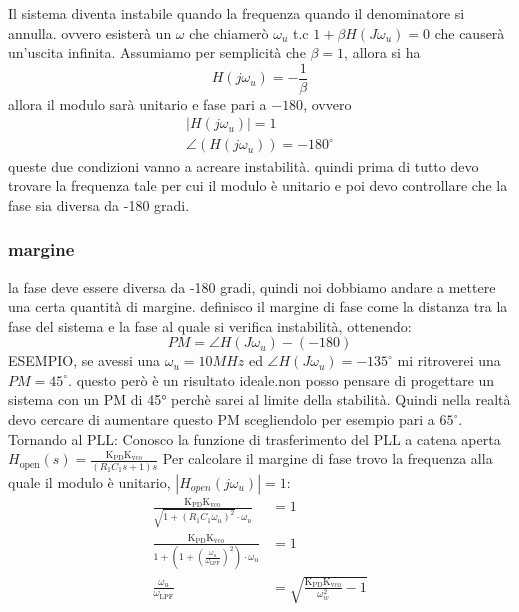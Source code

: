 Il sistema diventa instabile quando la frequenza quando il denominatore si annulla.
ovvero esisterà un $\omega$ che chiamerò $\omega_u$ t.c $1+\beta H(J \omega_u)=0$ che causerà un'uscita infinita.
Assumiamo per semplicità che $\beta=1$, allora si ha
\begin{equation}
    H(j\omega_u)=-\frac{1}{\beta}
\end{equation}
allora il modulo sarà unitario e fase pari a $-180$, ovvero
\begin{align}
    |H(j\omega_u)|=1 \\
    \angle(H(j\omega_u))=-180^\circ
\end{align}
queste due condizioni vanno a acreare instabilità.
quindi prima di tutto devo trovare la frequenza tale per cui il modulo è unitario e poi devo controllare che la fase sia diversa da -180 gradi. 

\subsubsection{margine}
la fase deve essere diversa da -180 gradi, quindi noi dobbiamo andare a mettere una certa quantità di margine.
definisco il margine di fase come la distanza tra la fase del sistema e la fase al quale si verifica instabilità, ottenendo:
\begin{equation}
    PM=\angle H(J\omega_u) -(-180)
\end{equation}
ESEMPIO, se avessi una $\omega_u=10MHz$ ed $\angle H(J\omega_u)=-135 ^\circ$ mi ritroverei una $PM=45 ^\circ$.
questo però è un risultato ideale.non posso pensare di progettare un sistema con un PM di 45° perchè sarei al limite della stabilità.
Quindi nella realtà devo cercare di aumentare questo PM scegliendolo per esempio pari a $65^\circ$.
%
Tornando al PLL:%
Conosco la funzione di trasferimento del PLL a catena aperta $ H_{\text{open}}(s) = \frac{\text{K}_{\text{PD}} \text{K}_{\text{vco}}}{(R_1 C_1 s + 1) s} $
Per calcolare il margine di fase trovo la frequenza alla quale il modulo è unitario, $|H_{open}(j\omega_u)|=1$:%
\begin{align}
    \frac{\text{K}_{\text{PD}}\text{K}_{\text{vco}}}{\sqrt{1 + (R_1 C_1 \omega_u)^2} \cdot \omega_u} &= 1 \\
    \frac{\text{K}_{\text{PD}}\text{K}_{\text{vco}}}{1 + \left( 1 + \left(\frac{\omega_u}{\omega_{\text{LPF}}}\right)^2 \right) \cdot \omega_u} &= 1 \\
    \frac{\omega_u}{\omega_{\text{LPF}}} &= \sqrt{\frac{\text{K}_{\text{PD}}\text{K}_{\text{vco}}}{\omega_w^2} - 1}
\end{align}

